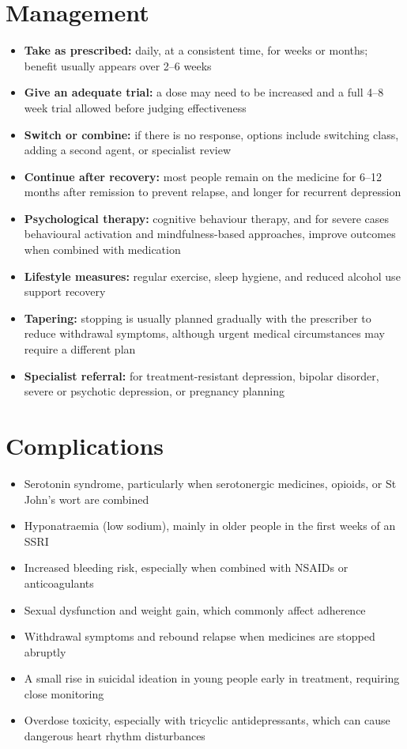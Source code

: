 \section*{Management}
\begin{itemize}
    \item \textbf{Take as prescribed:} daily, at a consistent time, for weeks or months; benefit usually appears over 2--6 weeks
    \item \textbf{Give an adequate trial:} a dose may need to be increased and a full 4--8 week trial allowed before judging effectiveness
    \item \textbf{Switch or combine:} if there is no response, options include switching class, adding a second agent, or specialist review
    \item \textbf{Continue after recovery:} most people remain on the medicine for 6--12 months after remission to prevent relapse, and longer for recurrent depression
    \item \textbf{Psychological therapy:} cognitive behaviour therapy, and for severe cases behavioural activation and mindfulness-based approaches, improve outcomes when combined with medication
    \item \textbf{Lifestyle measures:} regular exercise, sleep hygiene, and reduced alcohol use support recovery
    \item \textbf{Tapering:} stopping is usually planned gradually with the prescriber to reduce withdrawal symptoms, although urgent medical circumstances may require a different plan
    \item \textbf{Specialist referral:} for treatment-resistant depression, bipolar disorder, severe or psychotic depression, or pregnancy planning
\end{itemize}

\section*{Complications}
\begin{itemize}
    \item Serotonin syndrome, particularly when serotonergic medicines, opioids, or St John's wort are combined
    \item Hyponatraemia (low sodium), mainly in older people in the first weeks of an SSRI
    \item Increased bleeding risk, especially when combined with NSAIDs or anticoagulants
    \item Sexual dysfunction and weight gain, which commonly affect adherence
    \item Withdrawal symptoms and rebound relapse when medicines are stopped abruptly
    \item A small rise in suicidal ideation in young people early in treatment, requiring close monitoring
    \item Overdose toxicity, especially with tricyclic antidepressants, which can cause dangerous heart rhythm disturbances
\end{itemize}

